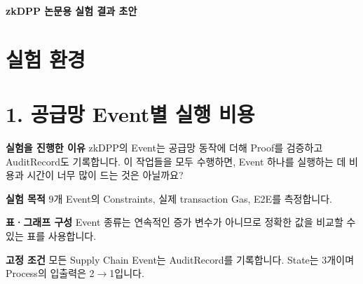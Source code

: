 \documentclass[11pt,a4paper]{article}
\begin{document}
{\LARGE\bfseries zkDPP 논문용 실험 결과 초안}\par\medskip
\section*{실험 환경}

\section*{1. 공급망 Event별 실행 비용}
\textbf{실험을 진행한 이유}\newline
zkDPP의 Event는 공급망 동작에 더해 Proof를 검증하고 AuditRecord도 기록합니다.\newline
이 작업들을 모두 수행하면, Event 하나를 실행하는 데 비용과 시간이 너무 많이 드는 것은 아닐까요?

\textbf{실험 목적}\newline
9개 Event의 Constraints, 실제 transaction Gas, E2E를 측정합니다.\newline

\textbf{표·그래프 구성}\newline
Event 종류는 연속적인 증가 변수가 아니므로 정확한 값을 비교할 수 있는 표를 사용합니다.\newline

\textbf{고정 조건}\newline
모든 Supply Chain Event는 AuditRecord를 기록합니다.\newline
State는 3개이며 Process의 입출력은 2$\rightarrow$1입니다.\newline
\end{document}
